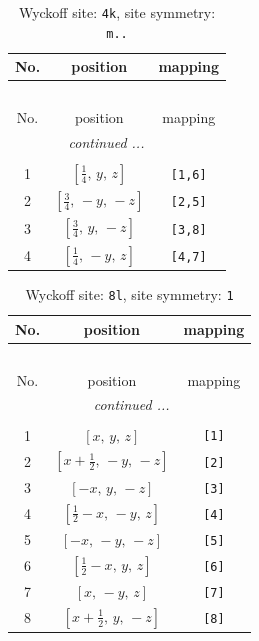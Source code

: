\documentclass[fleqn,8pt]{jsarticle}
\begin{document}
\renewcommand{\arraystretch}{1.2}
\begin{longtable}{ccc}
\caption{Wyckoff site: {\tt 4k}, site symmetry: {\tt m..}}
 \\
 \hline \hline
No. & position & mapping \\ \hline \endfirsthead

\multicolumn{2}{l}{\tablename\ \thetable{}} \\
 \hline \hline
No. & position & mapping \\ \hline \endhead

 \hline \hline
\multicolumn{2}{r}{\footnotesize\it continued ...} \\ \endfoot

 \hline \hline
\multicolumn{2}{r}{} \\ \endlastfoot

1 & $\left[ \frac{1}{4},\, y,\, z \right]$ & {\tt [1,6]} \\ \hline
2 & $\left[ \frac{3}{4},\, - y,\, - z \right]$ & {\tt [2,5]} \\ \hline
3 & $\left[ \frac{3}{4},\, y,\, - z \right]$ & {\tt [3,8]} \\ \hline
4 & $\left[ \frac{1}{4},\, - y,\, z \right]$ & {\tt [4,7]} \\
\end{longtable}
\renewcommand{\arraystretch}{1.2}
\begin{longtable}{ccc}
\caption{Wyckoff site: {\tt 8l}, site symmetry: {\tt 1}}
 \\
 \hline \hline
No. & position & mapping \\ \hline \endfirsthead

\multicolumn{2}{l}{\tablename\ \thetable{}} \\
 \hline \hline
No. & position & mapping \\ \hline \endhead

 \hline \hline
\multicolumn{2}{r}{\footnotesize\it continued ...} \\ \endfoot

 \hline \hline
\multicolumn{2}{r}{} \\ \endlastfoot

1 & $\left[ x,\, y,\, z \right]$ & {\tt [1]} \\ \hline
2 & $\left[ x + \frac{1}{2},\, - y,\, - z \right]$ & {\tt [2]} \\ \hline
3 & $\left[ - x,\, y,\, - z \right]$ & {\tt [3]} \\ \hline
4 & $\left[ \frac{1}{2} - x,\, - y,\, z \right]$ & {\tt [4]} \\ \hline
5 & $\left[ - x,\, - y,\, - z \right]$ & {\tt [5]} \\ \hline
6 & $\left[ \frac{1}{2} - x,\, y,\, z \right]$ & {\tt [6]} \\ \hline
7 & $\left[ x,\, - y,\, z \right]$ & {\tt [7]} \\ \hline
8 & $\left[ x + \frac{1}{2},\, y,\, - z \right]$ & {\tt [8]} \\
\end{longtable}
\end{document}
